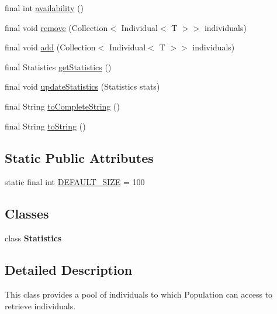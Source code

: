 \begin{CompactItemize}
\item 
final int \hyperlink{classjenes_1_1population_1_1_pool_3_01_t_01extends_01_chromosome_01_4_8e4a835cda9803129b44c952459ed7da}{availability} ()
\item 
final void \hyperlink{classjenes_1_1population_1_1_pool_3_01_t_01extends_01_chromosome_01_4_fcaf4da5e38def2dfcc15f7fb26103a0}{remove} (Collection$<$ Individual$<$ T $>$$>$ individuals)
\item 
final void \hyperlink{classjenes_1_1population_1_1_pool_3_01_t_01extends_01_chromosome_01_4_3ca4f417430b89dc388c1b4bbf8af98e}{add} (Collection$<$ Individual$<$ T $>$$>$ individuals)
\item 
final Statistics \hyperlink{classjenes_1_1population_1_1_pool_3_01_t_01extends_01_chromosome_01_4_4dad9ede915eee82d23a76a95af866ed}{getStatistics} ()
\item 
final void \hyperlink{classjenes_1_1population_1_1_pool_3_01_t_01extends_01_chromosome_01_4_5e0915555c9dd5baa482bab3acc830fd}{updateStatistics} (Statistics stats)
\item 
final String \hyperlink{classjenes_1_1population_1_1_pool_3_01_t_01extends_01_chromosome_01_4_cedbe69e9804076bc546d97925a9d3bb}{toCompleteString} ()
\item 
final String \hyperlink{classjenes_1_1population_1_1_pool_3_01_t_01extends_01_chromosome_01_4_f44d9f24db7bd43df43ceb1098146d0c}{toString} ()
\end{CompactItemize}
\subsection*{Static Public Attributes}
\begin{CompactItemize}
\item 
static final int \hyperlink{classjenes_1_1population_1_1_pool_3_01_t_01extends_01_chromosome_01_4_7495db191e994037e32f9869c83db6b3}{DEFAULT\_\-SIZE} = 100
\end{CompactItemize}
\subsection*{Classes}
\begin{CompactItemize}
\item 
class \textbf{Statistics}
\end{CompactItemize}


\subsection{Detailed Description}
This class provides a pool of individuals to which Population can access to retrieve individuals.

